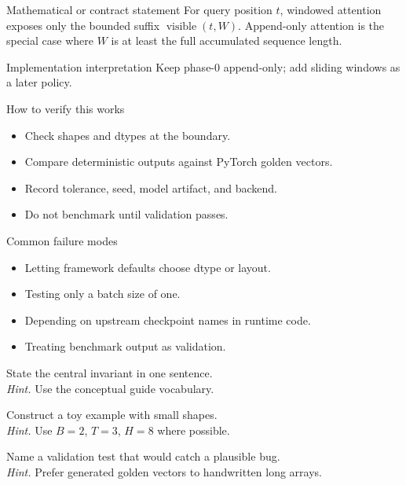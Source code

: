 \begin{definitionbox}{Mathematical or contract statement}
For query position \(t\), windowed attention exposes only the bounded suffix \(\operatorname{visible}(t,W)\). Append-only attention is the special case where \(W\) is at least the full accumulated sequence length.
\end{definitionbox}

\begin{implementationbox}{Implementation interpretation}
Keep phase-0 append-only; add sliding windows as a later policy.
\end{implementationbox}

\begin{verificationbox}{How to verify this works}
\begin{itemize}
\item Check shapes and dtypes at the boundary.
\item Compare deterministic outputs against PyTorch golden vectors.
\item Record tolerance, seed, model artifact, and backend.
\item Do not benchmark until validation passes.
\end{itemize}
\end{verificationbox}

\begin{warningbox}{Common failure modes}
\begin{itemize}
\item Letting framework defaults choose dtype or layout.
\item Testing only a batch size of one.
\item Depending on upstream checkpoint names in runtime code.
\item Treating benchmark output as validation.
\end{itemize}
\end{warningbox}

\begin{chapterexercises}
\item State the central invariant in one sentence.\\
\textit{Hint.} Use the conceptual guide vocabulary.
\item Construct a toy example with small shapes.\\
\textit{Hint.} Use $B=2$, $T=3$, $H=8$ where possible.
\item Name a validation test that would catch a plausible bug.\\
\textit{Hint.} Prefer generated golden vectors to handwritten long arrays.
\end{chapterexercises}

